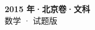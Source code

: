 \documentclass[zihao=-4, a4paper]{ctexart}
\begin{document}
\begin{center}
  {\Large\bfseries 2015 年·北京卷·文科}\\[4pt]
  {\large 数学 · 试题版}
\end{center}
\medskip
{}

\end{document}
